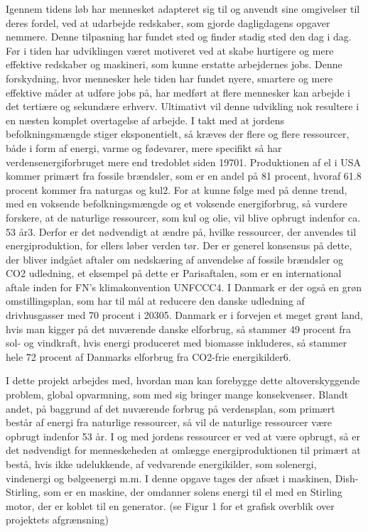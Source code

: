 \documentclass[SRC.tex]{subfiles}
\begin{document}
	Igennem tidens løb har mennesket adapteret sig til og anvendt sine omgivelser til deres fordel, ved at udarbejde redskaber, som gjorde dagligdagens opgaver nemmere. Denne tilpasning har fundet sted og finder stadig sted den dag i dag. Før i tiden har udviklingen været motiveret ved at skabe hurtigere og mere effektive redskaber og maskineri, som kunne erstatte arbejdernes jobs. Denne forskydning, hvor mennesker hele tiden har fundet nyere, smartere og mere effektive måder at udføre jobs på, har medført at flere mennesker kan arbejde i det tertiære og sekundære erhverv. Ultimativt vil denne udvikling nok resultere i en næsten komplet overtagelse af arbejde. I takt med at jordens befolkningsmængde stiger eksponentielt, så kræves der flere og flere ressourcer, både i form af energi, varme og fødevarer, mere specifikt så har verdensenergiforbruget mere end tredoblet siden 19701. Produktionen af el i USA kommer primært fra fossile brændsler, som er en andel på 81 procent, hvoraf 61.8 procent kommer fra naturgas og kul2. For at kunne følge med på denne trend, med en voksende befolkningsmængde og et voksende energiforbrug, så vurdere forskere, at de naturlige ressourcer, som kul og olie, vil blive opbrugt indenfor ca. 53 år3.  Derfor er det nødvendigt at ændre på, hvilke ressourcer, der anvendes til energiproduktion, for ellers løber verden tør. Der er generel konsensus på dette, der bliver indgået aftaler om nedskæring af anvendelse af fossile brændsler og CO2 udledning, et eksempel på dette er Parisaftalen, som er en international aftale inden for FN’s klimakonvention UNFCCC4. I Danmark er der også en grøn omstillingsplan, som har til mål at reducere den danske udledning af drivhusgasser med 70 procent i 20305. Danmark er i forvejen et meget grønt land, hvis man kigger på det nuværende danske elforbrug, så stammer 49 procent fra sol- og vindkraft, hvis energi produceret med biomasse inkluderes, så stammer hele 72 procent af Danmarks elforbrug fra CO2-frie energikilder6.  
	
	I dette projekt arbejdes med, hvordan man kan forebygge dette altoverskyggende problem, global opvarmning, som med sig bringer mange konsekvenser. Blandt andet, på baggrund af det nuværende forbrug på verdensplan, som primært består af energi fra naturlige ressourcer, så vil de naturlige ressourcer være opbrugt indenfor 53 år. I og med jordens ressourcer er ved at være opbrugt, så er det nødvendigt for menneskeheden at omlægge energiproduktionen til primært at bestå, hvis ikke udelukkende, af vedvarende energikilder, som solenergi, vindenergi og bølgeenergi m.m. I denne opgave tages der afsæt i maskinen, Dish-Stirling, som er en maskine, der omdanner solens energi til el med en Stirling motor, der er koblet til en generator. (se Figur 1 for et grafisk overblik over projektets afgrænsning) 
\end{document}
